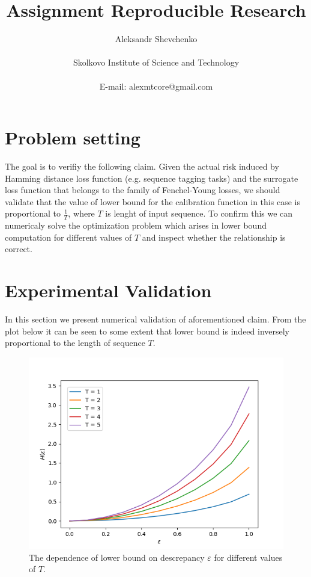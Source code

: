 \documentclass[11pt]{article}
\title{Assignment Reproducible Research}
\author
{Aleksandr Shevchenko\\
\\
\normalsize{Skolkovo Institute of Science and Technology}\\
\\
\normalsize{E-mail:  alexmtcore@gmail.com}
}
\date{}
\begin{document}
 

\maketitle 

\newpage

\section{Problem setting}

The goal is to verifiy the following claim. Given the actual risk induced by Hamming distance loss function (e.g. sequence tagging tasks) and the surrogate loss function that
belongs to the family of Fenchel-Young losses, we should validate that the value of lower bound for the calibration function in this case is proportional to
$\frac{1}{T}$, where $T$ is lenght of input sequence. To confirm this we can numericaly solve the optimization problem which arises in lower bound computation for different values
of $T$ and inspect whether the relationship is correct.


\section{Experimental Validation}

In this section we present numerical validation of aforementioned claim. From the plot below it can be seen to some extent that lower bound is indeed inversely proportional to the length of
sequence $T$.

\begin{figure}[ht]
    \centering
    \includegraphics[width=\textwidth]{figs/comparison}
    \caption{The dependence of lower bound on descrepancy $\varepsilon$ for different values of $T$.}
\end{figure}
\end{document}
